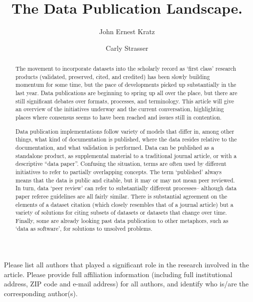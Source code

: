 \documentclass[10pt,a4paper,twocolumn]{article}
\begin{document}
\title{The Data Publication Landscape.}
\author[1]{John Ernest Kratz}
\author[1]{Carly Strasser}

\maketitle
\thispagestyle{fancy}

Please list all authors that played a significant role in the research involved in the article. Please provide full affiliation information (including full institutional address, ZIP code and e-mail address) for all authors, and identify who is/are the corresponding author(s).

\begin{abstract}

The movement to incorporate datasets into the scholarly record as `first class' research products (validated, preserved, cited, and credited) has been slowly building momentum for some time, but the pace of developments picked up substantially in the last year.
Data publications are beginning to spring up all over the place, but there are still significant debates over formats, processes, and terminology.
This article will give an overview of the initiatives underway and the current conversation, highlighting places where consensus seems to have been reached and issues still in contention.

Data publication implementations follow variety of models that differ in, among other things, what kind of documentation is published, where the data resides relative to the documentation, and what validation is performed. Data can be published as a standalone product, as supplemental material to a traditional journal article, or with a descriptive ``data paper''.
Confusing the situation, terms are often used by different initiatives to refer to partially overlapping concepts.
The term `published' always means that the data is public and citable, but it may or may not mean peer reviewed.
In turn, data `peer review' can refer to substantially different processes-- although data paper referee guidelines are all fairly similar.
There is substantial agreement on the elements of a dataset citation (which closely resembles that of a journal article) but a variety of solutions for citing subsets of datasets or datasets that change over time.
Finally, some are already looking past data publication to other metaphors, such as `data as software', for solutions to unsolved problems.

\end{abstract}
\clearpage
\end{document}
